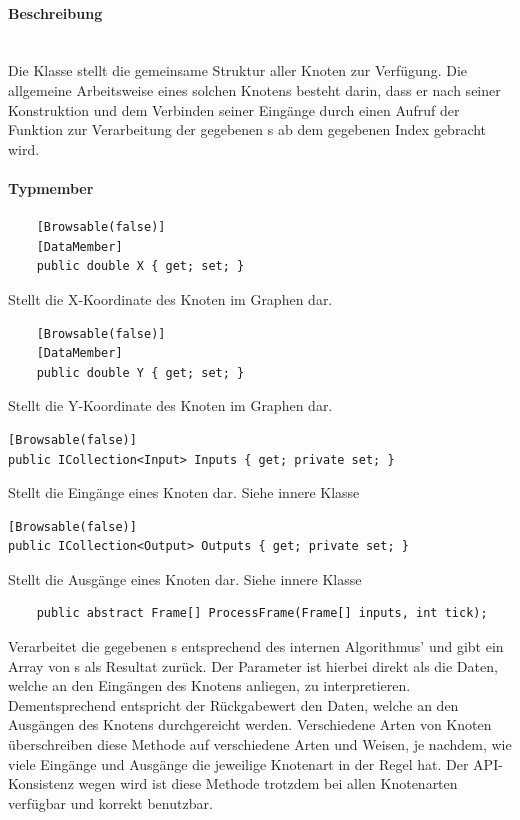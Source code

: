\paragraph{Beschreibung}~\\
Die Klasse  stellt die gemeinsame Struktur aller Knoten zur Verfügung. Die allgemeine Arbeitsweise eines solchen Knotens besteht darin, dass er nach seiner Konstruktion und dem Verbinden seiner Eingänge durch einen Aufruf der Funktion  zur Verarbeitung der gegebenen s ab dem gegebenen Index gebracht wird.

\paragraph{Typmember}
\begin{itemize}

	\begin{verbatim}
	[Browsable(false)]
	[DataMember]
	public double X { get; set; }
	\end{verbatim}
	Stellt die X-Koordinate des Knoten im Graphen dar.

	\begin{verbatim}
	[Browsable(false)]
	[DataMember]
	public double Y { get; set; }
	\end{verbatim}
	Stellt die Y-Koordinate des Knoten im Graphen dar.

	\begin{verbatim}
[Browsable(false)]
public ICollection<Input> Inputs { get; private set; }
	\end{verbatim}
Stellt die Eingänge eines Knoten dar. Siehe innere Klasse 

	\begin{verbatim}
[Browsable(false)]
public ICollection<Output> Outputs { get; private set; }
	\end{verbatim}
Stellt die Ausgänge eines Knoten dar. Siehe innere Klasse 

	\begin{verbatim}
	public abstract Frame[] ProcessFrame(Frame[] inputs, int tick);
	\end{verbatim}
	Verarbeitet die gegebenen s entsprechend des internen Algorithmus' und gibt ein Array von s als Resultat zurück. Der Parameter  ist hierbei direkt als die Daten, welche an den Eingängen des Knotens anliegen, zu interpretieren. Dementsprechend entspricht der Rückgabewert den Daten, welche an den Ausgängen des Knotens durchgereicht werden. Verschiedene Arten von Knoten überschreiben diese Methode auf verschiedene Arten und Weisen, je nachdem, wie viele Eingänge und Ausgänge die jeweilige Knotenart in der Regel hat. Der API-Konsistenz wegen wird ist diese Methode trotzdem bei allen Knotenarten verfügbar und korrekt benutzbar.


\end{itemize}

